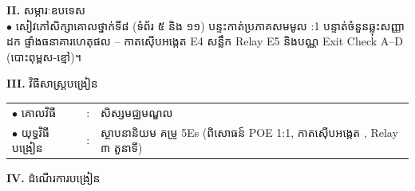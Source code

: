 \documentclass[a4paper,10pt]{article}
\newcommand{\en}[1]{{\TimesEn #1}}
\newcommand{\cnum}[1]{{\TimesEn\fontsize{10.5pt}{12pt}\selectfont\ding{\numexpr181+#1\relax}}\hspace{0.2em}}
\begin{document}
{\vspace{2pt}

\textbf{II.} {\muol សម្ភារៈឧបទេស}\\[2pt]
\hspace*{0.55cm}$\bullet$ \hspace{0.35cm} សៀវភៅសិក្សាគោលថ្នាក់ទី៨ (ទំព័រ ៥ និង ១១) បន្ទះកាត់ប្រភាគសមមូល \en{1:1} បន្ទាត់ចំនួនឆ្លុះសញ្ញាដក ផ្ទាំងធនាគារហេតុផល \cnum{1}--\cnum{5} កាតស៊ើបអង្កេត \en{E4} សន្លឹក \en{Relay E5} និងបណ្ណ \en{Exit Check A--D} (បោះពុម្ពស-ខ្មៅ)។

\vspace{2pt}

\textbf{III.} {\muol វិធីសាស្រ្តបង្រៀន}\\[2pt]
\hspace*{0.55cm}%
\begin{tabular}{@{}l l l@{}}
  $\bullet$ \hspace{0.35cm} គោលវិធី & : \hspace{0.7cm} & សិស្សមជ្ឈមណ្ឌល \\
  $\bullet$ \hspace{0.35cm} យុទ្ធវិធីបង្រៀន & : & ស្ថាបនានិយម គម្រូ \en{5Es} (ពិសោធន៍ \en{POE 1:1}, កាតស៊ើបអង្កេត \en{[tracing]}, \en{Relay} ៣ តួនាទី) \\
\end{tabular}
}

\vspace{2pt}

\textbf{IV.} {\muol ដំណើរការបង្រៀន}

\vspace{-3pt}
\end{document}
